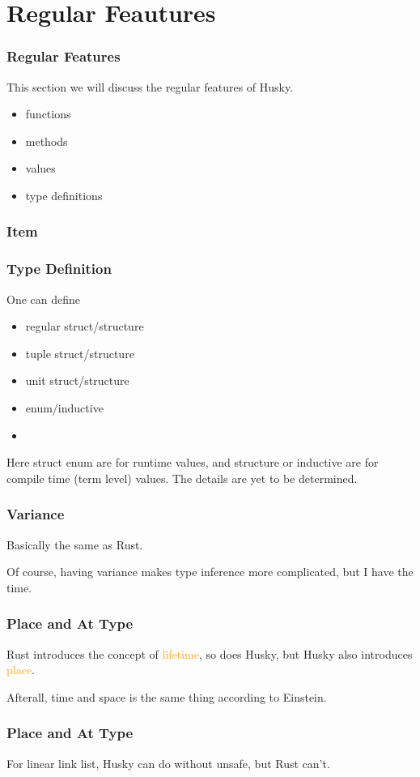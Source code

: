 \documentclass{beamer}   	%
\theoremstyle{definition}
\begin{document}
\section{Regular Feautures}
\begin{frame}
\frametitle{Regular Features}
This section we will discuss the regular features of Husky.

\begin{itemize}
	\item functions
	\item methods
	\item values
	\item type definitions
\end{itemize}
\end{frame}

\begin{frame}
\frametitle{Item}
\end{frame}

\begin{frame}
\frametitle{Type Definition}

One can define
\begin{itemize}
	\item regular struct/structure
	\item tuple struct/structure
	\item unit struct/structure
	\item enum/inductive
	\item 
\end{itemize}

Here struct enum are for runtime values, and structure or inductive are for compile time (term level) values. The details are yet to be determined.
\end{frame}

\begin{frame}
\frametitle{Variance}
Basically the same as Rust.

Of course, having variance makes type inference more complicated, but I have the time.
\end{frame}

\begin{frame}
\frametitle{Place and At Type}
Rust introduces the concept of \textcolor{orange}{lifetime}, so does Husky, but Husky also introduces \textcolor{orange}{place}. 

{\color{gray}Afterall, time and space is the same thing according to Einstein.}
\end{frame}

\begin{frame}
\frametitle{Place and At Type}
For linear link list, Husky can do without unsafe, but Rust can't.
\end{frame}
\end{document}
